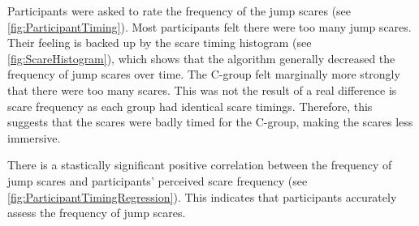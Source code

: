 \documentclass[12pt,a4paper]{article}\usepackage[]{graphicx}\usepackage[]{color}
\begin{document}
Participants were asked to rate the frequency of the jump scares (see \vref{fig:ParticipantTiming}).
Most participants felt there were too many jump scares.
Their feeling is backed up by the scare timing histogram (see \vref{fig:ScareHistogram}), which shows that the algorithm generally decreased the frequency of jump scares over time.
The C-group felt marginally more strongly that there were too many scares.
This was not the result of a real difference is scare frequency as each group had identical scare timings.
Therefore, this suggests that the scares were badly timed for the C-group, making the scares less immersive.

There is a stastically significant positive correlation between the frequency of jump scares and participants' perceived scare frequency (see \vref{fig:ParticipantTimingRegression}).
This indicates that participants accurately assess the frequency of jump scares.
\end{document}
